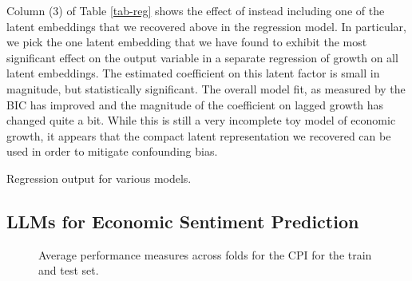 \documentclass{article}
\theoremstyle{plain}
\theoremstyle{definition}
\theoremstyle{remark}
\begin{document}
Column (3) of Table \ref{tab-reg} shows the effect of instead including one of the latent embeddings that we recovered above in the regression model. In particular, we pick the one latent embedding that we have found to exhibit the most significant effect on the output variable in a separate regression of growth on all latent embeddings. The estimated coefficient on this latent factor is small in magnitude, but statistically significant. The overall model fit, as measured by the BIC has improved and the magnitude of the coefficient on lagged growth has changed quite a bit. While this is still a very incomplete toy model of economic growth, it appears that the compact latent representation we recovered can be used in order to mitigate confounding bias.

\begin{table}
\caption{Regression output for various models.}\label{tab-reg}%

\end{table}

\subsection{LLMs for Economic Sentiment Prediction}


\begin{figure}


\caption{\label{fig-cpi}Average performance measures across folds for the CPI for the train and test set.}

\end{figure}%
\end{document}
